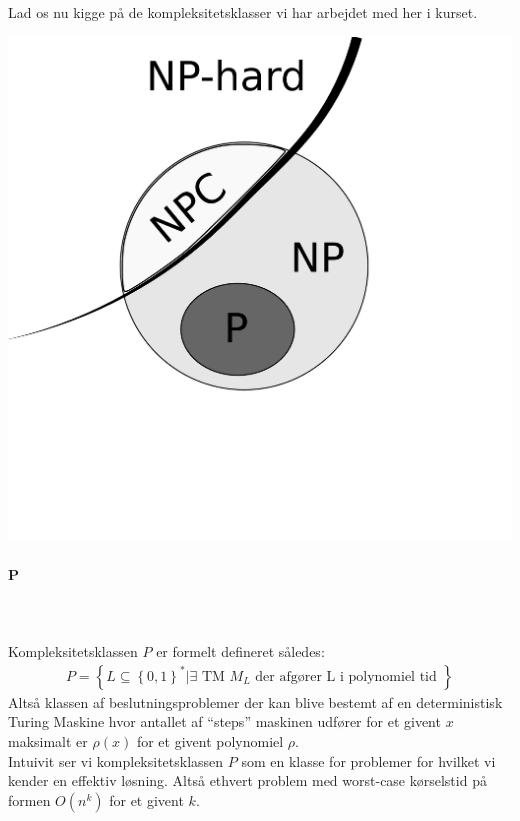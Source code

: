 Lad os nu kigge på de kompleksitetsklasser vi har arbejdet med her i kurset.
\begin{center}
 \includegraphics[bb=0 0 400 400,scale=0.3]{./PNPNPC.png}
\end{center}


\paragraph{P}
~\\
~\\
Kompleksitetsklassen $P$ er formelt defineret således:
\begin{align*}
 P = \left\lbrace L \subseteq \left\lbrace 0,1 \right\rbrace^* | \exists \text{ TM } M_L \text{ der afgører L i polynomiel tid } \right\rbrace
\end{align*}
Altså klassen af beslutningsproblemer der kan blive bestemt af en deterministisk Turing Maskine hvor antallet af ``steps'' maskinen udfører for et givent $x$ maksimalt er $\rho(x)$ for et givent polynomiel $\rho$.\\
 
Intuivit ser vi kompleksitetsklassen $P$ som en klasse for problemer for hvilket vi kender en effektiv løsning. Altså ethvert problem med worst-case kørselstid på formen $O(n^k)$ for et givent $k$.

